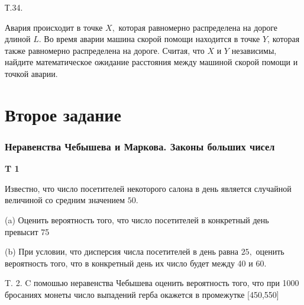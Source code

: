 \documentclass[a4paper,12pt]{article} %
\begin{document}
\begin{example}


Т.34. 

Авария происходит в точке $X,$ которая равномерно распределена на дороге длиной $L .$ 
Во время аварии машина скорой помощи находится в точке $Y$, которая также равномерно распределена на дороге. 
Считая, что $X$ и $Y$ независимы, найдите математическое ожидание расстояния между машиной скорой помощи и точкой аварии.



\end{example}














\clearpage
\part{Второе задание}


\section{Неравенства Чебышева и Маркова. Законы больших чисел}


\begin{example}\textbf{T 1}
	
Известно, что число посетителей некоторого салона в день является случайной величиной со средним значением $50 .$

(a) Оценить вероятность того, что число посетителей в конкретный день превысит 75

(b) При условии, что дисперсия числа посетителей в день равна $25,$ 
оценить вероятность того, что в конкретный день их число будет между 40 и $60 .$




\end{example}



\begin{example}

T. 2. $\mathrm{C}$ помошью неравенства Чебышева оценить вероятность того, что при 1000 бросаниях монеты число выпадений герба окажется в промежутке [450,550]




\end{example}
\end{document}
